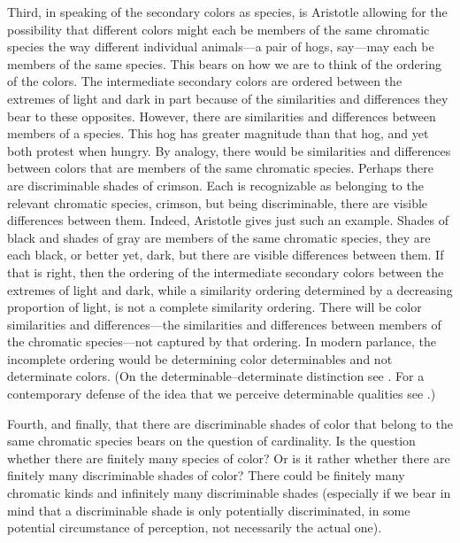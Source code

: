 Third, in speaking of the secondary colors as species, is Aristotle allowing for the possibility that different colors might each be members of the same chromatic species the way different individual animals---a pair of hogs, say---may each be members of the same species. This bears on how we are to think of the ordering of the colors. The intermediate secondary colors are ordered between the extremes of light and dark in part because of the similarities and differences they bear to these opposites. However, there are similarities and differences between members of a species. This hog has greater magnitude than that hog, and yet both protest when hungry. By analogy, there would be similarities and differences between colors that are members of the same chromatic species. Perhaps there are discriminable shades of crimson. Each is recognizable as belonging to the relevant chromatic species, crimson, but being discriminable, there are visible differences between them. Indeed, Aristotle gives just such an example. Shades of black and shades of gray are members of the same chromatic species, they are each black, or better yet, dark, but there are visible differences between them.  If that is right, then the ordering of the intermediate secondary colors between the extremes of light and dark, while a similarity ordering determined by a decreasing proportion of light, is not a complete similarity ordering. There will be color similarities and differences---the similarities and differences between members of the chromatic species---not captured by that ordering. In modern parlance, the incomplete ordering would be determining color determinables and not determinate colors. (On the determinable--determinate distinction see \citealt{Johnson:1921fk}. For a contemporary defense of the idea that we perceive determinable qualities see \citealt{Allen:2010ak,Hilbert:1987jq,Stazicker:2011an}.)

Fourth, and finally, that there are discriminable shades of color that belong to the same chromatic species bears on the question of cardinality. Is the question whether there are finitely many species of color? Or is it rather whether there are finitely many discriminable shades of color? There could be finitely many chromatic kinds and infinitely many discriminable shades (especially if we bear in mind that a discriminable shade is only potentially discriminated, in some potential circumstance of perception, not necessarily the actual one).

